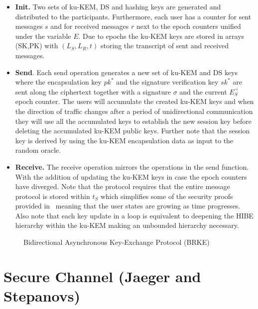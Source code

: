 \documentclass[11pt,a4paper,twoside,openright,bibliography=totoc]{scrbook}
\begin{document}
\begin{itemize}
\item \textbf{Init.} Two sets of ku-KEM, DS and hashing keys are generated
  and distributed to the participants. Furthermore, each user has a counter
  for sent messages $s$ and for received messages $r$ next to the epoch
  counters unified under the variable $E$. Due to epochs the ku-KEM keys
  are stored in arrays (SK,PK) with $(L_S,L_R,t)$ storing the transcript
  of sent and received messages.
\item \textbf{Send}. Each send operation generates a new set of
  ku-KEM and DS keys where the encapsulation key $pk^*$ and the
  signature verification key $sk^*$ are sent along the ciphertext
  together with a signature $\sigma$ and the current $E_S^\dashv$ epoch
  counter. The users will
  accumulate the created ku-KEM keys and when the direction
  of traffic changes after a period of unidirectional communication
  they will use all the accumulated keys to establish the new
  session key before deleting the accumulated ku-KEM public keys.
  Further note that the
  session key is derived by using the ku-KEM encapsulation data
  as input to the random oracle.
\item \textbf{Receive.} The receive operation mirrors the
  operations in the send function. With the addition
  of updating the ku-KEM keys in case the epoch counters have diverged.
  Note that the protocol requires that the entire message protocol
  is stored within $t_S$ which simplifies some of the security
  proofs provided in~\cite{poettering2018towards} meaning that
  the user states are growing as time progresses. Also note
  that each key update in a loop is equivalent to deepening
  the HIBE hierarchy within the ku-KEM making an unbounded
  hierarchy necessary.
\end{itemize}

\begin{figure}[p]
  \centering
  \setlength{\fboxsep}{10pt}
  \scalebox{0.9}{%
    \fbox{%
      
    }
  }
  \caption{Bidirectional Asynchronous Key-Exchange Protocol (BRKE)}
  \label{fig:brke}
\end{figure}

\clearpage

\section[Jaeger and Stepanovs]
{Secure Channel (Jaeger and Stepanovs)~\cite{jaeger2018optimal}}
\label{sec:jaeger-stepanovs}
\end{document}
